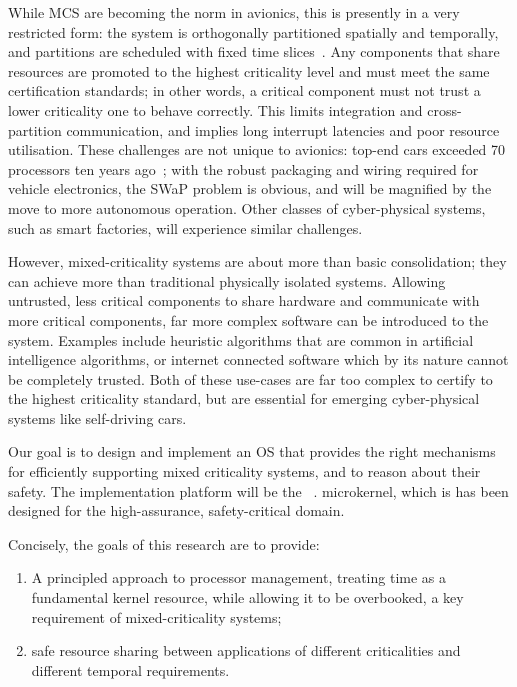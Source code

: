 While MCS are becoming the norm in avionics, this is presently in a very restricted form: the system
is orthogonally partitioned spatially and temporally, and partitions are scheduled with fixed time
slices~\citep{ARINC653}. Any components that share resources are promoted to the highest criticality
level and must meet the same certification standards; in other words, a critical component must not
trust a lower criticality one to behave correctly. This limits integration and cross-partition
communication, and implies long interrupt latencies and poor resource utilisation. 
These challenges are not unique to avionics: top-end cars exceeded 70 processors ten years
ago~\citep{Broy_KPS_07}; with the robust packaging and wiring required for vehicle electronics, the
SWaP problem is obvious, and will be magnified by the move to more autonomous operation. Other
classes of cyber-physical systems, such as smart factories, will experience similar challenges.

However, mixed-criticality systems are about more than basic consolidation; they can achieve more
than traditional physically isolated systems. Allowing untrusted, less critical components to
share hardware and communicate with more critical components, far more complex software can be
introduced to the system. Examples include heuristic algorithms that are common in artificial
intelligence algorithms, or internet connected software which by its nature cannot be completely
trusted. Both of these use-cases are far too complex to certify to the highest criticality standard,
but are essential for emerging cyber-physical systems like self-driving cars.

Our goal is to design and implement an OS that provides the right mechanisms for efficiently
supporting mixed criticality systems, and to reason about their safety.
The implementation platform will be the \selfour~\citep{Klein_EHACDEEKNSTW_09}.
microkernel, which is has been designed for the high-assurance, safety-critical domain.

Concisely, the goals of this research are to provide:
\begin{enumerate}[label=\textbf{G\arabic*}] 
    \item\label{G1} A principled approach to
    processor management, treating time as a fundamental kernel resource, while
    allowing it to be overbooked, a key requirement of mixed-criticality systems;
    \item safe resource sharing between applications of different criticalities and
    different temporal requirements.  
\end{enumerate}


